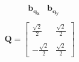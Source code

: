 \documentclass[preview]{standalone}
\begin{document}
\begin{align*}
\begin{array}{c}\begin{matrix}\hspace{1cm} \mathbf{b_{q_x}} & \mathbf{b_{q_y}}  \end{matrix} \\ \mathbf{Q} = \begin{bmatrix} \frac{\sqrt{2}}{2} & \frac{\sqrt{2}}{2} \\ \\-\frac{\sqrt{2}}{2} &  \frac{\sqrt{2}}{2} \end{bmatrix} \end{array}
\end{align*}
\end{document}
